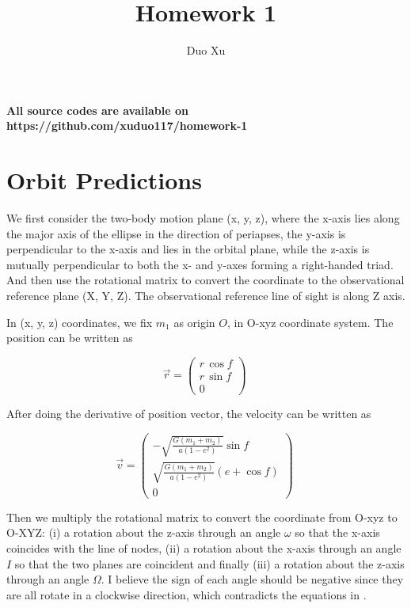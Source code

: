 \documentclass[12pt]{article}
\begin{document}
\title{Homework 1}
\author{Duo Xu}

{\bf All source codes are available on https://github.com/xuduo117/homework-1}

\section{Orbit Predictions}
\label{Orbit Predictions}

We first consider the two-body motion plane (x, y, z), where the x-axis lies along the major axis of the ellipse in the direction of periapses, the y-axis is perpendicular to the x-axis and lies in the orbital plane, while the z-axis is mutually perpendicular to both the x- and y-axes forming a right-handed triad. And then use the rotational matrix to convert the coordinate to the observational reference plane (X, Y, Z). The observational reference line of sight is along Z axis.


In (x, y, z) coordinates, we fix $m_{1}$ as origin $O$, in O-xyz coordinate system. The position can be written as 

\[  \vec{r} = \left ( \begin{array}{c}
 r\, \cos f  \\
 r\, \sin f \\
0\end{array} \right )\ \]

After doing the derivative of position vector, the velocity can be written as 

\[  \vec{v} = \left ( \begin{array}{c}
 -\sqrt{\frac{G(m_{1}+m_{2})}{a(1-e^{2})}}\sin f  \\
\sqrt{\frac{G(m_{1}+m_{2})}{a(1-e^{2})}} (e+\cos f) \\
0\end{array} \right )\ \]

Then we multiply the rotational matrix to convert the coordinate from O-xyz to O-XYZ:  (i) a rotation about the z-axis through an angle $\omega$ so that the x-axis coincides with the line of nodes, (ii) a rotation about the x-axis through an angle $I$ so that the two planes are coincident and finally (iii) a rotation about the z-axis through an angle $\Omega$. I believe the sign of each angle should be negative since they are all rotate in a clockwise direction, which contradicts the equations in \citet{2010exop.book...15M}. 
\end{document}
